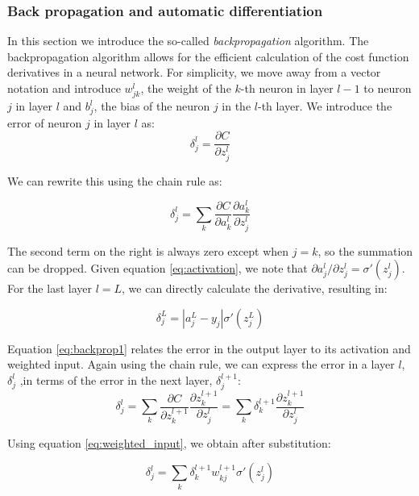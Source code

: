 \documentclass{Dissertate}
\begin{document}
\hypertarget{back-propagation-and-automatic-differentiation}{%
\subsubsection*{Back propagation and automatic
differentiation}\label{back-propagation-and-automatic-differentiation}}

In this section we introduce the so-called \emph{backpropagation}
algorithm. The backpropagation algorithm allows for the efficient
calculation of the cost function derivatives in a neural network. For
simplicity, we move away from a vector notation and introduce
\(w^l_{jk}\), the weight of the \(k\)-th neuron in layer \(l-1\) to
neuron \(j\) in layer \(l\) and \(b^l_j\), the bias of the neuron \(j\)
in the \(l\)-th layer. We introduce the error of neuron \(j\) in layer
\(l\) as: \[
\delta^l_j=\frac{\partial C}{\partial z^l_j}
\]

We can rewrite this using the chain rule as:

\[
\delta^l_j = \sum_k \frac{\partial C}{\partial a^l_{k}}\frac{\partial a^l_{k}}{\partial z^l_{j}}
\]

The second term on the right is always zero except when \(j=k\), so the
summation can be dropped. Given equation \ref{eq:activation}, we
note that \(\partial a^l_{j}/\partial z^l_{j} = \sigma'(z^l_j)\). For
the last layer \(l = L\), we can directly calculate the derivative,
resulting in:

\begin{equation}
\delta^L_j =  |a^L_j-y_j|\sigma'(z^L_j)
\label{eq:backprop1}\end{equation}

Equation \ref{eq:backprop1} relates the error in the output layer to
its activation and weighted input. Again using the chain rule, we can
express the error in a layer \(l\), \(\delta^{l}_j\) ,in terms of the
error in the next layer, \(\delta^{l+1}_j\): \[
\delta^l_j = \sum_k \frac{\partial C}{\partial z^{l+1}_{k}}\frac{\partial z^{l+1}_{k}}{\partial z^l_{j}} = \sum_k \delta^{l+1}_k\frac{\partial z^{l+1}_{k}}{\partial z^l_{j}}
\]

Using equation \ref{eq:weighted_input}, we obtain after
substitution:

\begin{equation}
\delta^l_j = \sum_k\delta^{l+1}_kw^{l+1}_{kj}\sigma'(z^l_j)
\label{eq:backprop2}\end{equation}
\end{document}
